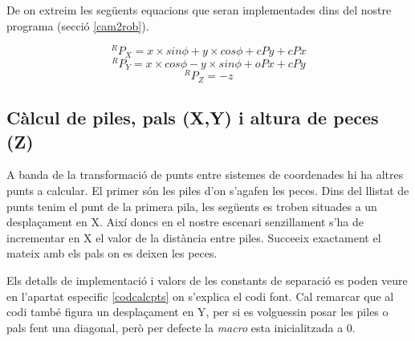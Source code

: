 De on extreim les següents equacions que seran implementades dins del
nostre programa (secció \ref{cam2rob}).

$$^RP_X = x\times sin \phi + y \times cos \phi + cPy + cPx$$
$$^RP_Y = x\times cos \phi - y \times sin \phi + oPx + cPy$$
$$^RP_Z = -z$$

\subsection{Càlcul de piles, pals (X,Y) i altura de peces (Z)} \label{calcpts}
A banda de la transformació de punts entre sistemes de coordenades hi ha altres punts a calcular.
El primer són les piles d'on s'agafen les peces. Dins del llistat de punts tenim el punt de la primera
pila, les següents es troben situades a un desplaçament en X. Així doncs en el nostre escenari
senzillament s'ha de incrementar en X el valor de la distància entre piles. Succeeix exactament
el mateix amb els pals on es deixen les peces.

Els detalls de implementació i valors de les constants de separació es poden veure en l'apartat
especific \ref{codcalcpts} on s'explica el codi font. Cal remarcar que al codi també figura un
desplaçament en Y, per si es volguessin posar les piles o pals fent una diagonal, però per
defecte la \emph{macro} esta inicialitzada a 0.




